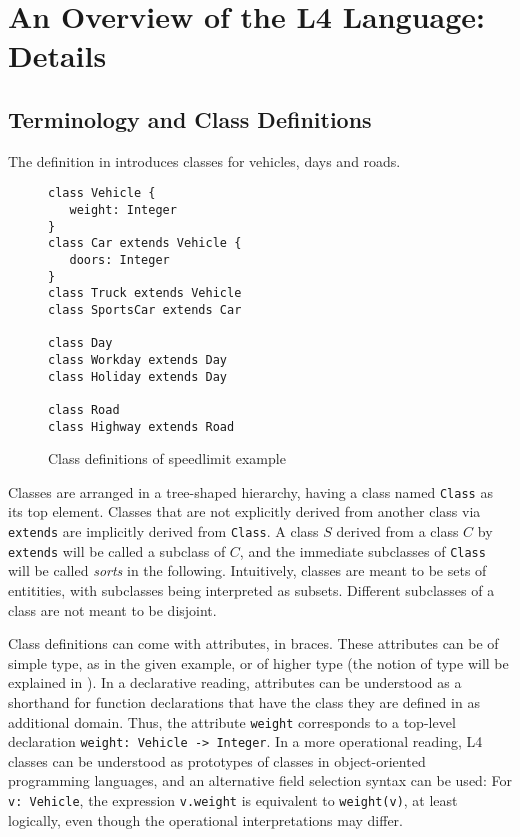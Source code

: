 \section{An Overview of the L4 Language: Details}\label{sec:l4_language_app}


\subsection{Terminology and Class Definitions}\label{sec:classdefs}

The definition in  introduces classes for vehicles, days
and roads. 

\begin{figure}[h!]
\begin{lstlisting}
class Vehicle {
   weight: Integer
}
class Car extends Vehicle {
   doors: Integer
}
class Truck extends Vehicle
class SportsCar extends Car

class Day
class Workday extends Day
class Holiday extends Day

class Road
class Highway extends Road
\end{lstlisting}
  \caption{Class definitions of speedlimit example}\label{fig:classdefs}
\end{figure}

Classes are arranged in a tree-shaped hierarchy, having a class named
\texttt{Class} as its top element. Classes that are not explicitly derived
from another class via \texttt{extends} are implicitly derived from
\texttt{Class}. A class $S$ derived from a class $C$ by \texttt{extends} will
be called a subclass of $C$, and the immediate subclasses of \texttt{Class}
will be called \emph{sorts} in the following. Intuitively, classes are meant
to be sets of entitities, with subclasses being interpreted as
subsets. Different subclasses of a class are not meant to be disjoint.

Class definitions can come with attributes, in braces. These attributes can be
of simple type, as in the given example, or of higher type (the notion of type
will be explained in ). In a declarative reading,
attributes can be understood as a shorthand for function declarations that
have the class they are defined in as additional domain. Thus, the attribute
\texttt{weight} corresponds to a top-level declaration \texttt{weight: Vehicle
  -> Integer}. In a more operational reading, L4 classes can be understood as
prototypes of classes in object-oriented programming languages, and an
alternative field selection syntax can be used: For \texttt{v: Vehicle}, the
expression \texttt{v.weight} is equivalent to \texttt{weight(v)}, at least
logically, even though the operational interpretations may differ.


